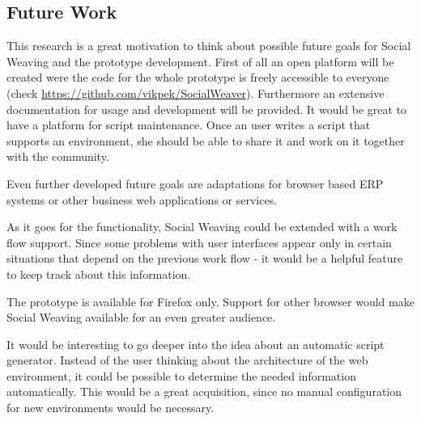 \subsection{Future Work}
This research is a great motivation to think about possible future goals for Social Weaving and the prototype development. First of all an open platform will be created were the code for the whole prototype is freely accessible to everyone (check \url{https://github.com/vikpek/SocialWeaver}). Furthermore an extensive documentation for usage and development will be provided. It would be great to have a platform for script maintenance. Once an user writes a script that supports an environment, she should be able to share it and work on it together with the community. 

Even further developed future goals are adaptations for browser based ERP systems or other business web applications or services.  

As it goes for the functionality, Social Weaving could be extended with a work flow support. Since some problems with user interfaces appear only in certain situations that depend on the previous work flow - it would be a helpful feature to keep track about this information. 

The prototype is available for Firefox only. Support for other browser would make Social Weaving available for an even greater audience.

It would be interesting to go deeper into the idea about an automatic script generator. Instead of the user thinking about the architecture of the web environment, it could be possible to determine the needed information automatically. This would be a great acquisition, since no manual configuration for new environments would be necessary. 



